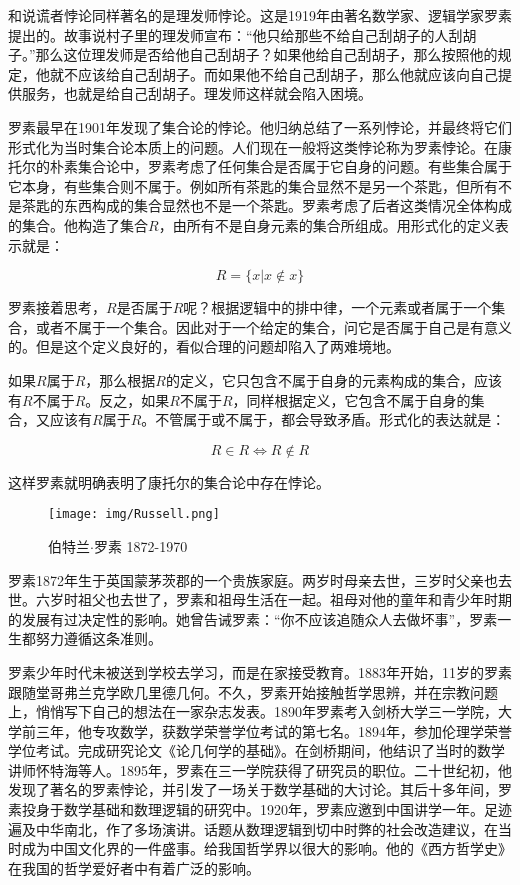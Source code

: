 \documentclass[b5paper]{ctexart}
\begin{document}
和说谎者悖论同样著名的是理发师悖论。这是1919年由著名数学家、逻辑学家罗素提出的。故事说村子里的理发师宣布：“他只给那些不给自己刮胡子的人刮胡子。”那么这位理发师是否给他自己刮胡子？如果他给自己刮胡子，那么按照他的规定，他就不应该给自己刮胡子。而如果他不给自己刮胡子，那么他就应该向自己提供服务，也就是给自己刮胡子。理发师这样就会陷入困境。

罗素最早在1901年发现了集合论的悖论。他归纳总结了一系列悖论，并最终将它们形式化为当时集合论本质上的问题。人们现在一般将这类悖论称为罗素悖论。在康托尔的朴素集合论中，罗素考虑了任何集合是否属于它自身的问题。有些集合属于它本身，有些集合则不属于。例如所有茶匙的集合显然不是另一个茶匙，但所有不是茶匙的东西构成的集合显然也不是一个茶匙。罗素考虑了后者这类情况全体构成的集合。他构造了集合$R$，由所有不是自身元素的集合所组成。用形式化的定义表示就是：

\[
R = \{ x | x \notin x \}
\]

罗素接着思考，$R$是否属于$R$呢？根据逻辑中的排中律，一个元素或者属于一个集合，或者不属于一个集合。因此对于一个给定的集合，问它是否属于自己是有意义的。但是这个定义良好的，看似合理的问题却陷入了两难境地。

如果$R$属于$R$，那么根据$R$的定义，它只包含不属于自身的元素构成的集合，应该有$R$不属于$R$。反之，如果$R$不属于$R$，同样根据定义，它包含不属于自身的集合，又应该有$R$属于$R$。不管属于或不属于，都会导致矛盾。形式化的表达就是：

\[
R \in R \iff R \notin R
\]

这样罗素就明确表明了康托尔的集合论中存在悖论。

\begin{wrapfigure}{R}{0.3\textwidth}
 \centering
 \texttt{[image: img/Russell.png]}
 \caption{伯特兰$\cdot$罗素 1872-1970}
 \label{fig:Russell}
\end{wrapfigure}

罗素1872年生于英国蒙茅茨郡的一个贵族家庭。两岁时母亲去世，三岁时父亲也去世。六岁时祖父也去世了，罗素和祖母生活在一起。祖母对他的童年和青少年时期的发展有过决定性的影响。她曾告诫罗素：“你不应该追随众人去做坏事”，罗素一生都努力遵循这条准则。

罗素少年时代未被送到学校去学习，而是在家接受教育。1883年开始，11岁的罗素跟随堂哥弗兰克学欧几里德几何。不久，罗素开始接触哲学思辨，并在宗教问题上，悄悄写下自己的想法在一家杂志发表。1890年罗素考入剑桥大学三一学院，大学前三年，他专攻数学，获数学荣誉学位考试的第七名。1894年，参加伦理学荣誉学位考试。完成研究论文《论几何学的基础》。在剑桥期间，他结识了当时的数学讲师怀特海等人。1895年，罗素在三一学院获得了研究员的职位。二十世纪初，他发现了著名的罗素悖论，并引发了一场关于数学基础的大讨论。其后十多年间，罗素投身于数学基础和数理逻辑的研究中。1920年，罗素应邀到中国讲学一年。足迹遍及中华南北，作了多场演讲。话题从数理逻辑到切中时弊的社会改造建议，在当时成为中国文化界的一件盛事。给我国哲学界以很大的影响。他的《西方哲学史》在我国的哲学爱好者中有着广泛的影响。
\end{document}
